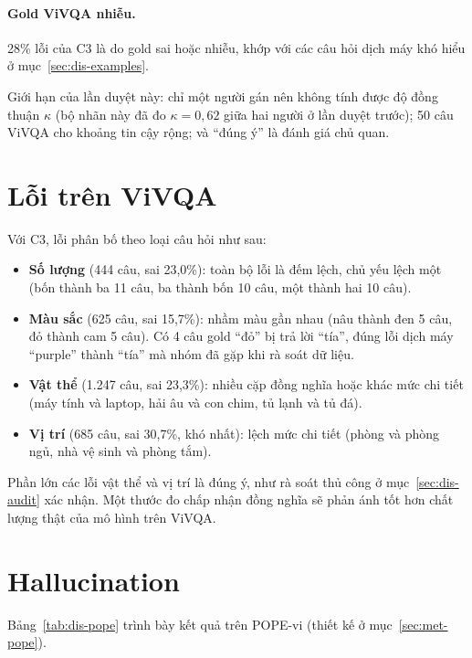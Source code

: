 \paragraph{Gold ViVQA nhiễu.} 28\% lỗi của C3 là do gold sai hoặc nhiễu, khớp với
các câu hỏi dịch máy khó hiểu ở mục~\ref{sec:dis-examples}.

Giới hạn của lần duyệt này: chỉ một người gán nên không tính được độ đồng thuận
$\kappa$ (bộ nhãn này đã đo $\kappa = 0{,}62$ giữa hai người ở lần duyệt trước);
50 câu ViVQA cho khoảng tin cậy rộng; và ``đúng ý'' là đánh giá chủ quan.

\section{Lỗi trên ViVQA}
\label{sec:dis-vivqa}

Với C3, lỗi phân bố theo loại câu hỏi như sau:

\begin{itemize}
  \item \textbf{Số lượng} (444 câu, sai 23,0\%): toàn bộ lỗi là đếm lệch, chủ yếu
  lệch một (bốn thành ba 11 câu, ba thành bốn 10 câu, một thành hai 10 câu).
  \item \textbf{Màu sắc} (625 câu, sai 15,7\%): nhầm màu gần nhau (nâu thành đen
  5 câu, đỏ thành cam 5 câu). Có 4 câu gold ``đỏ'' bị trả lời ``tía'', đúng lỗi
  dịch máy ``purple'' thành ``tía'' mà nhóm đã gặp khi rà soát dữ liệu.
  \item \textbf{Vật thể} (1.247 câu, sai 23,3\%): nhiều cặp đồng nghĩa hoặc khác
  mức chi tiết (máy tính và laptop, hải âu và con chim, tủ lạnh và tủ đá).
  \item \textbf{Vị trí} (685 câu, sai 30,7\%, khó nhất): lệch mức chi tiết (phòng
  và phòng ngủ, nhà vệ sinh và phòng tắm).
\end{itemize}

Phần lớn các lỗi vật thể và vị trí là đúng ý, như rà soát thủ công ở
mục~\ref{sec:dis-audit} xác nhận. Một thước đo chấp nhận đồng nghĩa sẽ phản ánh
tốt hơn chất lượng thật của mô hình trên ViVQA.

\section{Hallucination}
\label{sec:dis-halluc}

Bảng~\ref{tab:dis-pope} trình bày kết quả trên POPE-vi (thiết kế ở
mục~\ref{sec:met-pope}).

